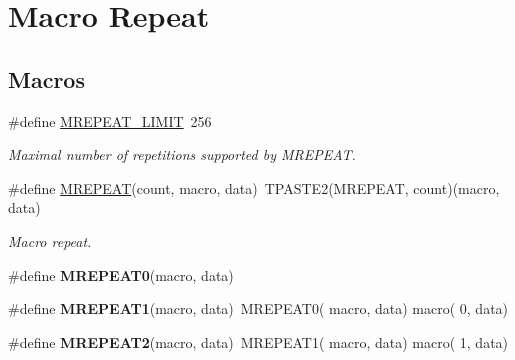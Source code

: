 \hypertarget{group__group__xmega__utils__mrepeat}{\section{Macro Repeat}
\label{group__group__xmega__utils__mrepeat}
}
\subsection*{Macros}
\begin{DoxyCompactItemize}
\item 
\hypertarget{group__group__xmega__utils__mrepeat_gab145883b0377c1a0065481f8609da400}{\#define \hyperlink{group__group__xmega__utils__mrepeat_gab145883b0377c1a0065481f8609da400}{M\-R\-E\-P\-E\-A\-T\-\_\-\-L\-I\-M\-I\-T}~256}\label{group__group__xmega__utils__mrepeat_gab145883b0377c1a0065481f8609da400}

\begin{DoxyCompactList}\small\item\em Maximal number of repetitions supported by M\-R\-E\-P\-E\-A\-T. \end{DoxyCompactList}\item 
\#define \hyperlink{group__group__xmega__utils__mrepeat_ga42db715ccb877ca87d7903f5783bd104}{M\-R\-E\-P\-E\-A\-T}(count, macro, data)~T\-P\-A\-S\-T\-E2(M\-R\-E\-P\-E\-A\-T, count)(macro, data)
\begin{DoxyCompactList}\small\item\em Macro repeat. \end{DoxyCompactList}\item 
\hypertarget{group__group__xmega__utils__mrepeat_ga7f990d7cdc87a6f9166b4af1de35442f}{\#define {\bfseries M\-R\-E\-P\-E\-A\-T0}(macro, data)}\label{group__group__xmega__utils__mrepeat_ga7f990d7cdc87a6f9166b4af1de35442f}

\item 
\hypertarget{group__group__xmega__utils__mrepeat_ga667cd6585e7a3579adf6cbcb4ba76cf9}{\#define {\bfseries M\-R\-E\-P\-E\-A\-T1}(macro, data)~M\-R\-E\-P\-E\-A\-T0(  macro, data)   macro(  0, data)}\label{group__group__xmega__utils__mrepeat_ga667cd6585e7a3579adf6cbcb4ba76cf9}

\item 
\hypertarget{group__group__xmega__utils__mrepeat_gacd3377453f77f937bffd9bb00f6de684}{\#define {\bfseries M\-R\-E\-P\-E\-A\-T2}(macro, data)~M\-R\-E\-P\-E\-A\-T1(  macro, data)   macro(  1, data)}\label{group__group__xmega__utils__mrepeat_gacd3377453f77f937bffd9bb00f6de684}


\end{DoxyCompactItemize}
